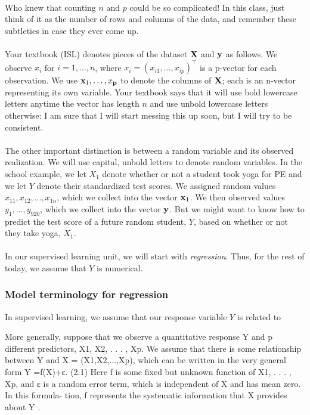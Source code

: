 \documentclass[titlepage,10pt]{scrartcl}
\begin{document}
\\
Who knew that counting $n$ and $p$ could be so complicated! In this class, just think of it as the number of rows and columns of the data, and remember these subtleties in case they ever come up. \\
\\
Your textbook (ISL) denotes pieces of the dataset $\bold{X}$ and $\bold{y}$ as follows. We observe $x_i$ for $i = 1,\ldots,n$, where $x_i = (x_{i1}, \ldots, x_{ip})^\top$ is a p-vector for each observation. We use $\bold{x}_1,\ldots,x_\bold{p}$ to denote the columns of $\bold{X}$; each is an n-vector representing its own variable. Your textbook says that it will use bold lowercase letters anytime the vector has length $n$ and use unbold lowercase letters otherwise: I am sure that I will start messing this up soon, but I will try to be consistent. \\
\\
The other important distinction is between a random variable and its observed realization. We will use capital, unbold letters to denote random variables. In the school example, we let $X_1$ denote whether or not a student took yoga for PE and we let $Y$ denote their standardized test scores. We assigned random values $x_{11}, x_{12},\ldots, x_{1n}$, which we collect into the vector $\bold{x}_1$. We then observed values $y_1,\ldots,y_{920}$, which we collect into the vector $\bold{y}$. But we might want to know how to predict the test score of a future random student, $Y$, based on whether or not they take yoga, $X_1$. \\
\\
In our supervised learning unit, we will start with \emph{regression}. Thus, for the rest of today, we assume that $Y$ is numerical. 

\subsubsection{Model terminology for regression}



In supervised learning, we assume that our response variable $Y$ is related to 

More generally, suppose that we observe a quantitative response Y and p different predictors, X1, X2, . . . , Xp. We assume that there is some relationship between Y and X = (X1,X2,...,Xp), which can be written in the very general form
Y =f(X)+ε. (2.1)
Here f is some fixed but unknown function of X1, . . . , Xp, and ε is a random error term, which is independent of X and has mean zero. In this formula- tion, f represents the systematic information that X provides about Y .
\end{document}

